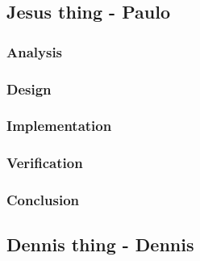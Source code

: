 \subsection{Jesus thing - Paulo}
%
\subsubsection{Analysis}
%
%
\subsubsection{Design}
%
%
\subsubsection{Implementation}
%
%
\subsubsection{Verification}
%
\subsubsection{Conclusion}
\subsection{Dennis thing - Dennis}
%
